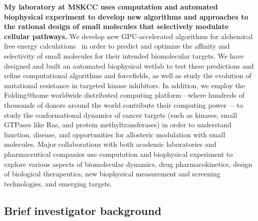\documentclass[10pt]{article}
\begin{document}
{\bf My laboratory at MSKCC uses computation and automated biophysical experiment to develop new algorithms and approaches to the rational design of small molecules that selectively modulate cellular pathways.}
We develop new GPU-accelerated algorithms for alchemical free energy calculations~\cite{tembe-mccammon:comput-chem:1984:alchemical-free-energy-calculations,shirts-mobley-chodera:2007:annu-rep-comput-chem:prime-time,chodera:curr-opin-struct-biol:2011:drug-discovery,wang:jcamd:2013:yank} in order to predict and optimize the affinity and selectivity of small molecules for their intended biomolecular targets.
We have designed and built an automated biophysical wetlab to test these predictions and refine computational algorithms and forcefields, as well as study the evolution of mutational resistance in targeted kinase inhibitors.
In addition, we employ the Folding@home worldwide distributed computing platform---where hundreds of thousands of donors around the world contribute their computing power~\cite{shirts-pande:science:2000:folding-at-home,folding-at-home-stats}---to study the conformational dynamics of cancer targets (such as kinases, small GTPases like Ras, and protein methyltransferases) in order to understand function, disease, and opportunities for allosteric modulation with small molecules.
Major collaborations with both academic laboratories and pharmaceutical companies use computation and biophysical experiment to explore various aspects of biomolecular dynamics, drug pharmacokinetics, design of biological therapeutics, new biophysical measurement and screening technologies, and emerging targets.

\subsection*{Brief investigator background}
\end{document}

